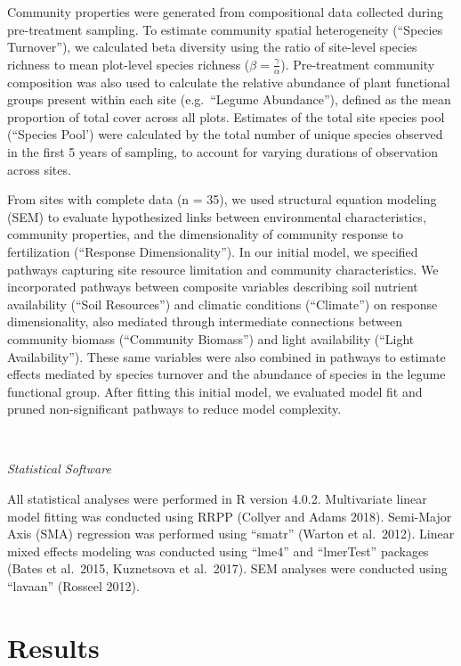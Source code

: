 \documentclass[twoside,12pt,final]{ucthesis-CA2012}
\begin{document}
\begin{ucmainmatter}
Community properties were generated from compositional data collected during pre-treatment sampling. To estimate community spatial heterogeneity (``Species Turnover''), we calculated beta diversity using the ratio of site-level species richness to mean plot-level species richness (\(\beta=\frac{\gamma}{\alpha}\)). Pre-treatment community composition was also used to calculate the relative abundance of plant functional groups present within each site (e.g.~``Legume Abundance''), defined as the mean proportion of total cover across all plots. Estimates of the total site species pool (``Species Pool') were calculated by the total number of unique species observed in the first 5 years of sampling, to account for varying durations of observation across sites.

From sites with complete data (n = 35), we used structural equation modeling (SEM) to evaluate hypothesized links between environmental characteristics, community properties, and the dimensionality of community response to fertilization (``Response Dimensionality''). In our initial model, we specified pathways capturing site resource limitation and community characteristics. We incorporated pathways between composite variables describing soil nutrient availability (``Soil Resources'') and climatic conditions (``Climate'') on response dimensionality, also mediated through intermediate connections between community biomass (``Community Biomass'') and light availability (``Light Availability''). These same variables were also combined in pathways to estimate effects mediated by species turnover and the abundance of species in the legume functional group. After fitting this initial model, we evaluated model fit and pruned non-significant pathways to reduce model complexity.

~

\emph{Statistical Software}

All statistical analyses were performed in R version 4.0.2. Multivariate linear model fitting was conducted using RRPP (Collyer and Adams 2018). Semi-Major Axis (SMA) regression was performed using ``smatr'' (Warton et al.~2012). Linear mixed effects modeling was conducted using ``lme4'' and ``lmerTest'' packages (Bates et al.~2015, Kuznetsova et al.~2017). SEM analyses were conducted using ``lavaan'' (Rosseel 2012).

\hypertarget{results}{%
\section{Results}\label{results}}


\end{ucmainmatter}
\end{document}
